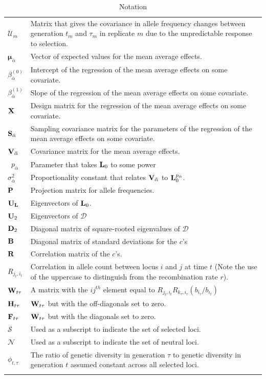 \documentclass[12pt]{article}
\begin{document}
\begin{longtable}{|p{2cm}|p{13cm}|}
$\boldsymbol{\mathcal{U}}_m$&Matrix that gives the covariance in allele frequency changes between generation $t_m$ and $\tau_m$ in replicate $m$ due to the unpredictable response to selection.\\
$\boldsymbol{\mu}_{\bar{\alpha}}$&Vector of expected values for the mean average effects.\\
$\beta^{(0)}_{\bar{\alpha}}$&Intercept of the regression of the mean average effects on some covariate.\\
$\beta^{(1)}_{\bar{\alpha}}$&Slope of the regression of the mean average effects on some covariate.\\
${\bf X}$&Design matrix for the regression of the mean average effects on some covariate.\\
${\bf S}_{\bar{\alpha}}$&Sampling covariance matrix for the parameters of the regression of the mean average effects on some covariate.\ \\
$\bf{V}_{\bar{\alpha}}$&Covariance matrix for the mean average effects.\\\
$p_{\bar{\alpha}}$&Parameter that takes ${\bf L}_0$ to some power \\
$\sigma^{2}_{\bar{\alpha}}$&Proportionality constant that relates $\bf{V}_{\bar{\alpha}}$ to ${\bf L}_{0}^{p_{\bar{\alpha}}}$.\\
${\bf P}$&Projection matrix for allele frequencies.\\
${\bf U}_{\bf L}$&Eigenvectors of ${\bf L}_0$.\\
${\bf U}_{2}$&Eigenvectors of $\boldsymbol{\mathcal{D}}$\\
${\bf D}_{2}$&Diagonal matrix of square-rooted eigenvalues of $\boldsymbol{\mathcal{D}}$\\
${\bf B}$&Diagonal matrix of standard deviations for the $c$'s\\
${\bf R}$&Correlation matrix of the $c$'s.\\
$R_{j_t,i_t}$&Correlation in allele count between locus $i$ and $j$ at time $t$ (Note the use of the uppercase to distinguish from the recombination rate $r$).\\
${\bf W}_{t\tau}$&A matrix with the $ij^{th}$ element equal to $R_{j_t,i_t}R_{k_{\tau},i_{\tau}}(b_{i_\tau}/b_{i_t})$\\
${\bf H}_{t\tau}$&${\bf W}_{t\tau}$ but with the off-diagonals set to zero.\\
${\bf F}_{t\tau}$&${\bf W}_{t\tau}$ but with the diagonals set to zero.\\
$\mathcal{S}$&Used as a subscript to indicate the set of selected loci.\\
$\mathcal{N}$&Used as a subscript to indicate the set of neutral loci.\\
$\phi_{t,\tau}$&The ratio of genetic diversity in generation $\tau$ to genetic diversity in generation $t$ assumed constant across all selected loci.\\
\hline
\caption{Notation}
\label{tab:notation}
\end{longtable}
\end{document}

